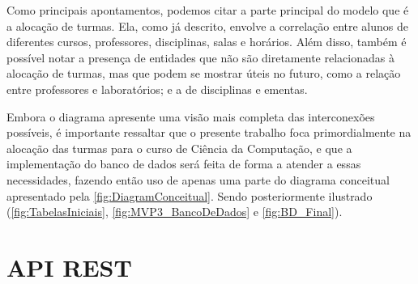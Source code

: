 Como principais apontamentos, podemos citar a parte principal do modelo que é a alocação de turmas. Ela, como já descrito, envolve a correlação entre alunos de diferentes cursos, professores, disciplinas, salas e horários. Além disso, também é possível notar a presença de entidades que não são diretamente relacionadas à alocação de turmas, mas que podem se mostrar úteis no futuro, como a relação entre professores e laboratórios; e a de disciplinas e ementas.

Embora o diagrama apresente uma visão mais completa das interconexões possíveis, é importante ressaltar que o presente trabalho foca primordialmente na alocação das turmas para o curso de Ciência da Computação, e que a implementação do banco de dados será feita de forma a atender a essas necessidades, fazendo então uso de apenas uma parte do diagrama conceitual apresentado pela \autoref{fig:DiagramConceitual}. Sendo posteriormente ilustrado (\autoref{fig:TabelasIniciais}, \autoref{fig:MVP3_BancoDeDados} e \autoref{fig:BD_Final}).





\section{API REST} \label{sec:REST} %


